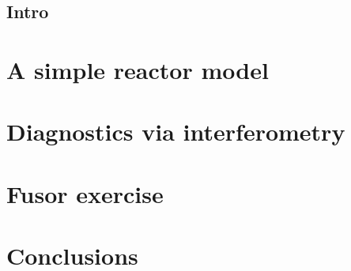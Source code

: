 \documentclass[aps, prb, a4paper, english, 12pt, onecolumn, longbibliography, amsmath, amssymb, colorinlistoftodos, floatfix]{revtex4-1}
\begin{document}

\tableofcontents

\makeatletter
\let\toc@pre\relax
\let\toc@post\relax
\makeatother

\thispagestyle{empty}
\setcounter{page}{1}

\subsection{Intro}

\section{A simple reactor model}

\section{Diagnostics via interferometry}

\section{Fusor exercise}
\newpage
\section{Conclusions}

\onecolumngrid


\newpage
\listoffigures
\listoftables
\listoflistings
\newpage

\end{document}

